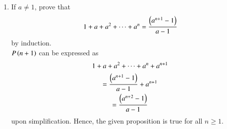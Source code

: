 \begin{enumerate}[label=\arabic*.,ref=\thesubsection.\theenumi]
	\item If $a \ne 1$, prove that 
		\begin{align}
			1 + a + a^2 + \cdots + a^{n} = \frac{\left(a^{n+1}-1\right)}{a-1}
		\end{align}
		by induction.
		\\
		\solution $P\left(n+1\right)$ can be expressed as 
		\begin{multline}
			1 + a + a^2 + \cdots + a^{n} +a^{n+1}
			\\
			= \frac{\left(a^{n+1}-1\right)}{a-1} + a^{n+1}
			\\
			=\frac{\left(a^{n+2}-1\right)}{a-1} 
		\end{multline}
		upon simplification. Hence, the given proposition is true for all $n \ge 1$.
\end{enumerate}
